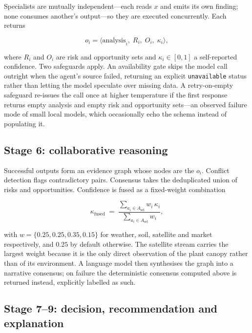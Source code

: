 \documentclass[preprint,12pt]{elsarticle}
\begin{document}
Specialists are mutually independent---each reads $x$ and emits its own
finding; none consumes another's output---so they are executed
concurrently. Each returns

\begin{equation}
o_i = \langle \mathrm{analysis}_i,\; R_i,\; O_i,\; \kappa_i \rangle ,
\end{equation}

where $R_i$ and $O_i$ are risk and opportunity sets and
$\kappa_i\in[0,1]$ a self-reported confidence. Two safeguards apply. An
availability gate skips the model call outright when the agent's source
failed, returning an explicit \texttt{unavailable} status rather than
letting the model speculate over missing data. A retry-on-empty safeguard
re-issues the call once at higher temperature if the first response returns
empty analysis and empty risk and opportunity sets---an observed failure
mode of small local models, which occasionally echo the schema instead of
populating it.

\subsection{Stage 6: collaborative reasoning}

Successful outputs form an evidence graph whose nodes are the $o_i$.
Conflict detection flags contradictory pairs. Consensus takes the
deduplicated union of risks and opportunities. Confidence is fused as a
fixed-weight combination

\begin{equation}
\kappa_{\mathrm{fused}} \;=\; \frac{\sum_{a_i \in A_{\mathrm{sel}}} w_i \,\kappa_i}{\sum_{a_i \in A_{\mathrm{sel}}} w_i},
\label{eq:fusion}
\end{equation}

with $w=\{0.25, 0.25, 0.35, 0.15\}$ for weather, soil, satellite and
market respectively, and $0.25$ by default otherwise. The satellite stream
carries the largest weight because it is the only direct observation of the
plant canopy rather than of its environment. A language model then
synthesises the graph into a narrative consensus; on failure the
deterministic consensus computed above is returned instead, explicitly
labelled as such.

\subsection{Stage 7--9: decision, recommendation and explanation}
\end{document}
